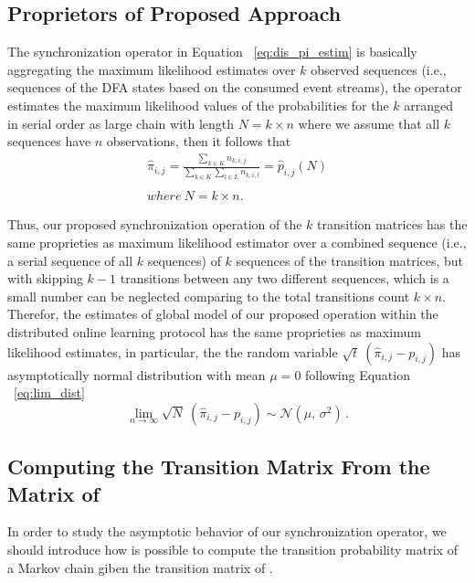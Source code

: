 \subsection{Proprietors of Proposed Approach}
\par The synchronization operator in Equation ~\ref{eq:dis_pi_estim} is basically aggregating  the maximum likelihood estimates over $k$ observed sequences (i.e., sequences of the DFA states based on the consumed event streams), the operator estimates the maximum likelihood values of the probabilities for the $k$ arranged in serial order as large chain with length $ N=k \times n$ where we assume that all $k$ sequences have $n$ observations, then it follows that 
\begin{equation}
\label{eq:dis_pi_estim2}
	\begin{aligned}
\hat{\pi}_{i,j}=\frac{\sum_{k \in K} n_{k,i,j}}{\sum_{k \in K} \sum_{l \in L} n_{k,i,l}} = \hat{p}_{i,j}(N)\\\\
 where\ N = k \times n.
 \end{aligned}
\end{equation}

\par Thus, our proposed synchronization operation of the $k$ transition matrices has the same proprieties as maximum likelihood estimator over a combined sequence (i.e., a serial sequence of all $k$ sequences) of $k$ sequences of the transition matrices, but with skipping $k-1$ transitions between any two different sequences, which is a small number can be neglected comparing to the total transitions count $k \times n$. Therefor, the estimates of global model of our proposed operation within the distributed online learning protocol has the same proprieties as maximum likelihood estimates, in particular, the the random variable $\sqrt{t}\ (\hat{\pi}_{i,j} - {p}_{i,j})$ has asymptotically normal distribution with mean $\mu=0$ following Equation ~\ref{eq:lim_dist}
\begin{equation}
\lim_{n\to\infty} \sqrt{N}\ (\hat{\pi}_{i,j} - {p}_{i,j}) \sim \mathcal{N}(\mu,\,\sigma^{2})\,.
\end{equation} 

\subsection{Computing the Transition Matrix From the Matrix of \pmcmr }

\par In order to study the asymptotic behavior of our synchronization operator, we should introduce how is possible to compute the transition probability matrix  of a Markov chain giben the transition matrix of \pmcmr.